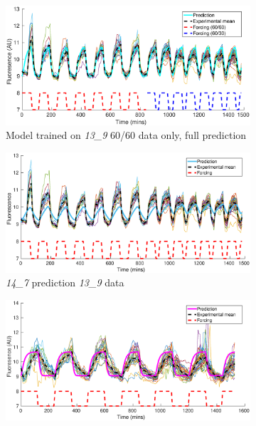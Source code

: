 \documentclass[10pt,journal]{./IEEE_latex_class/IEEEtran}
\begin{document}
 
 \begin{figure}[h]	
 	\begin{subfigure}[h]{0.49\textwidth}
    \centering
        \includegraphics[scale = 0.29,clip = true, trim = 82 0 70 0]{13_9_partial_data_13_9_pred}
        \caption{Model trained on \textit{13\_9}  60/60 data only, full prediction}
        \label{CrossValidation_1} 
    \end{subfigure}
	\begin{subfigure}[h]{0.49\textwidth}
    \centering
        \includegraphics[scale = 0.3,clip = true, trim = 87 0 70 0]{14_7_pred_13_9_data}
        \caption{\textit{14\_7} prediction \textit{13\_9} data}
        \label{CrossValidation_2} 
    \end{subfigure}
    \begin{subfigure}[h]{0.49\textwidth}
    \centering
        \includegraphics[scale = 0.3,clip = true, trim = 87 0 70 0]{13_9_pred_14_7_data}

\end{subfigure}
\end{figure}
\end{document}
